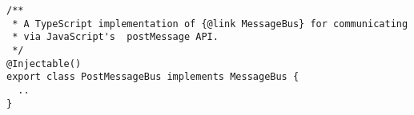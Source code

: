 \begin{verbatim}
/**
 * A TypeScript implementation of {@link MessageBus} for communicating
 * via JavaScript's  postMessage API.
 */
@Injectable()
export class PostMessageBus implements MessageBus {
  ..
}
\end{verbatim}
